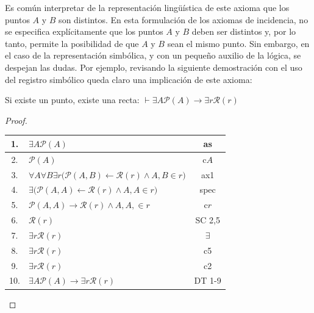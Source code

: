 Es común interpretar de la representación lingüística de este axioma que los puntos $A$ y $B$ son distintos. En esta formulación de los axiomas de incidencia, no se especifica explícitamente que los puntos $A$ y $B$ deben ser distintos y, por lo tanto, permite la posibilidad de que $A$ y $B$ sean el mismo punto. Sin embargo, en el caso de la representación simbólica, y con un pequeño auxilio de la lógica, se despejan las dudas. Por ejemplo, revisando la siguiente demostración con el uso del registro simbólico queda claro una implicación de este axioma:
\begin{teorema}
	Si existe un punto, existe una recta: $\vdash\exists A \mathcal{P}(A) \rightarrow \exists r \mathcal{R}(r)$
\end{teorema}

\begin{proof}
	~
	
	\begin{center}
		\def\arraystretch{1.5}
		\begin{tabular}{|c|l|c|}
			\hline 
			1. & $\exists A \mathcal{P}(A)$ & as\\
			\hline 
			2. & $\mathcal{P}(A)$ & c$A$\\
			\hline 
			3. & $\forall A \forall B \exists r \bigl( \mathcal{P}(A,B) \leftarrow \mathcal{R}(r) \wedge A,B \in r \bigr)$ & ax1\\
			\hline 
			4. & $\exists \bigl( \mathcal{P}(A,A) \leftarrow \mathcal{R}(r) \wedge A,A \in r \bigr)$ & spec\\
			\hline 
			5. & $\mathcal{P}(A,A) \rightarrow \mathcal{R}(r) \wedge A,A, \in r$ & c$r$\\
			\hline 
			6. & $\mathcal{R}(r)$ & SC 2,5\\
			\hline 
			7. & $\exists r \mathcal{R}(r)$ & $\exists$\\
			\hline 
			8. & $\exists r \mathcal{R}(r)$ & c5\\
			\hline 
			9. & $\exists r \mathcal{R}(r)$ & c2\\
			\hline 
			10. & $\exists A \mathcal{P}(A) \rightarrow \exists r \mathcal{R}(r)$ & DT 1-9\\
			\hline 
		\end{tabular}
	\end{center}
	
\end{proof}

